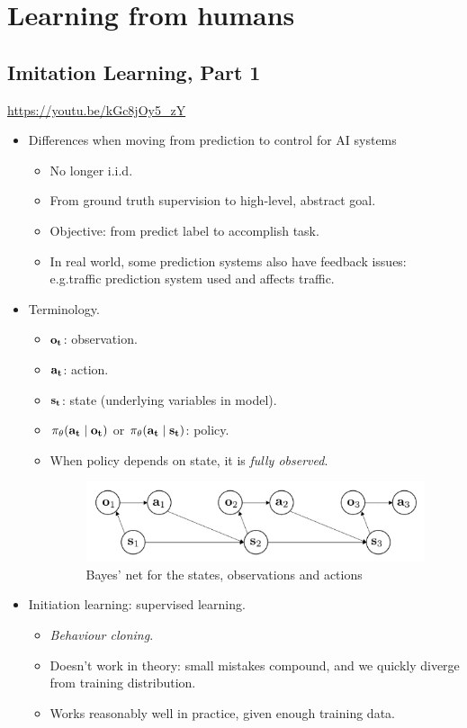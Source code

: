 
\chapter{Learning from humans}

\section{Imitation Learning, Part 1}

\url{https://youtu.be/kGc8jOy5_zY}

\begin{itemize}
    \item Differences when moving from prediction to control for AI systems
    \begin{itemize}
        \item No longer i.i.d.
        \item From ground truth supervision to high-level, abstract goal.
        \item Objective: from predict label to accomplish task.
        \item In real world, some prediction systems also have feedback issues: e.g.\@ traffic prediction system used and affects traffic.
    \end{itemize}
    \item Terminology.
    \begin{itemize}
        \item $\bf o_t$: observation.
        \item $\bf a_t$: action.
        \item $\bf s_t$: state (underlying variables in model).
        \item $\pi_\theta(\bf a_t \mid \bf o_t)$ or $\pi_\theta(\bf a_t \mid \bf s_t)$: policy.
        \item When policy depends on state, it is \emph{fully observed}.
        \begin{figure}[h!]
            \centering
            \includegraphics[width=.95\linewidth]{images/state-bayes-net.png}
            \caption{Bayes' net for the states, observations and actions}
            \label{fig:bayes net states}
        \end{figure}
    \end{itemize}
    \item Initiation learning: supervised learning.
    \begin{itemize}
        \item \emph{Behaviour cloning}.
        \item Doesn't work in theory: small mistakes compound, and we quickly diverge from training distribution.
        \item Works reasonably well in practice, given enough training data.
    \end{itemize}
\end{itemize}



